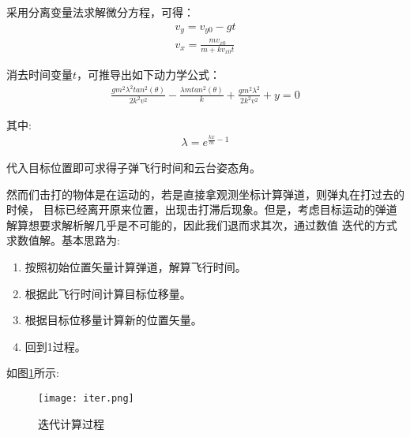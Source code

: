 采用分离变量法求解微分方程，可得：
\begin{gather}
    v_y = v_{y0}-gt \\
    v_x = \frac{m v_{x0}}{m+kv_{x0}t}
\end{gather}

消去时间变量$t$，可推导出如下动力学公式：
\begin{gather}
\frac{gm^2\lambda^2 tan^2(\theta)}{2k^2v^2}-\frac{\lambda m tan^2(\theta)}{k}+\frac{gm^2\lambda^2}{2k^2v^2}+y = 0
\end{gather}

其中:
\begin{gather}
    \lambda = e^{\frac{kx}{m}-1}
\end{gather}

代入目标位置即可求得子弹飞行时间和云台姿态角。\par
然而们击打的物体是在运动的，若是直接拿观测坐标计算弹道，则弹丸在打过去的时候，
目标已经离开原来位置，出现击打滞后现象。但是，考虑目标运动的弹道解算想要求解析解几乎是不可能的，因此我们退而求其次，通过数值
迭代的方式求数值解。基本思路为:
\begin{enumerate}
    \item 按照初始位置矢量计算弹道，解算飞行时间。
    \item 根据此飞行时间计算目标位移量。
    \item 根据目标位移量计算新的位置矢量。
    \item 回到1过程。
\end{enumerate}

如图\ref{迭代计算过程}所示:

\begin{figure}[H]
    \centering
    \texttt{[image: iter.png]} 
    \caption{迭代计算过程} 
    \label{迭代计算过程}
\end{figure}